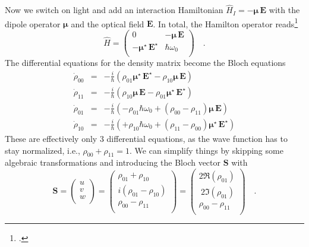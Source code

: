 Now we switch on light and add an interaction Hamiltonian $\hat{H}_I = -\boldsymbol{\mu} \, \boldsymbol{E}$ with the  dipole operator $\boldsymbol{\mu} $ and the optical field   $\boldsymbol{E}$. In total, the Hamilton operator reads\footcite[chap. 3.8]{Rand2016}
\begin{equation}
 \hat{H } = \begin{pmatrix}
  0 & - {\boldsymbol{\mu}} \, \boldsymbol{E} \\ - {\boldsymbol{\mu}}^\star \, \boldsymbol{E}^\star & \hbar \omega_0 \\
 \end{pmatrix} \quad . \label{eq:rabi_bloch_hamiltonian}
\end{equation}
The differential equations for the density matrix become the Bloch equations
\begin{eqnarray}
\dot{\rho}_{00} &=&  - \frac{i}{\hbar} \left( \rho_{01} \boldsymbol{\mu}^\star \, \boldsymbol{E}^\star - \rho_{10} \boldsymbol{\mu} \, \boldsymbol{E} \right) 
\label{eq:rabi_bloch_rho00}  \\
%
\dot{\rho}_{11} &=&  - \frac{i}{\hbar} \left( \rho_{10} \boldsymbol{\mu} \, \boldsymbol{E} - \rho_{01} \boldsymbol{\mu}^\star \, \boldsymbol{E}^\star \right) \\
%
\dot{\rho}_{01} &=& - \frac{i}{\hbar}  \left( - \rho_{01} \hbar \omega_0 + (\rho_{00} - \rho_{11})  \boldsymbol{\mu} \, \boldsymbol{E}\right) \\
%
\dot{\rho}_{10} &=& - \frac{i}{\hbar}  \left( + \rho_{10} \hbar \omega_0 + (\rho_{11} - \rho_{00})  \boldsymbol{\mu}^\star \, \boldsymbol{E}^\star \right) 
\label{eq:rabi_bloch_rho10}  %
\end{eqnarray}
These are effectively only 3 differential equations, as the wave function has to stay normalized, i.e., $\rho_{00} +\rho_{11} = 1$.
We can simplify things by skipping some algebraic transformations and introducing the Bloch vector $\boldsymbol{S}$ with
\begin{equation}
\boldsymbol{S} = 
\begin{pmatrix}
u \\ v \\ w \\
\end{pmatrix}
= 
\begin{pmatrix}
\rho_{01} + \rho_{10} \\ i (\rho_{01} - \rho_{10}) \\ \rho_{00} - \rho_{11} \\
\end{pmatrix}
= 
\begin{pmatrix}
2 \Re (\rho_{01})  \\ \ 2 \Im (\rho_{01}) \\ \rho_{00} - \rho_{11} \\
\end{pmatrix} \quad .
\end{equation}

